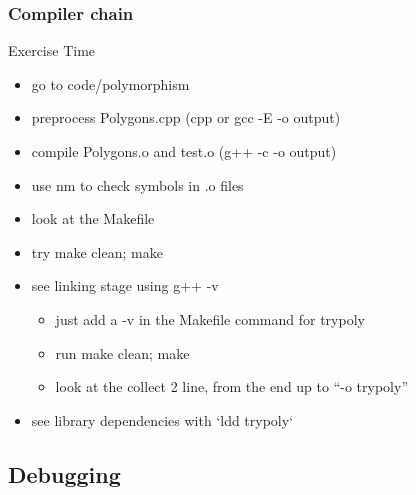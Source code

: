 \begin{frame}[fragile]
  \frametitle{Compiler chain}
  \begin{alertblock}{Exercise Time}
    \begin{itemize}
    \item go to code/polymorphism
    \item preprocess Polygons.cpp (cpp or gcc -E -o output)
    \item compile Polygons.o and test.o (g++ -c -o output)
    \item use nm to check symbols in .o files
    \item look at the Makefile
    \item try make clean; make
    \item see linking stage using g++ -v
      \begin{itemize}
      \item just add a -v in the Makefile command for trypoly
      \item run make clean; make
      \item look at the collect 2 line, from the end up to ``-o trypoly''
      \end{itemize}
    \item see library dependencies with `ldd trypoly`
    \end{itemize}
  \end{alertblock}
\end{frame}

\subsection[gdb]{Debugging}

